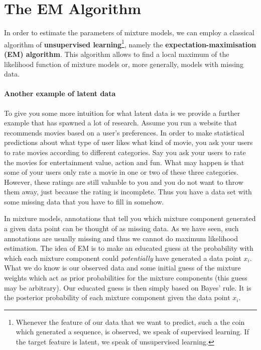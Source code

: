 \documentclass[a4paper,11pt,leqno]{report}\usepackage[]{graphicx}\usepackage[]{color}
\begin{document}
\section{The EM Algorithm}

In order to estimate the parameters of mixture models, we can employ a classical algorithm of 
\textbf{unsupervised learning}\footnote{Whenever the feature of our data that we want to predict, such a the coin which generated a sequence,
is observed, we speak of supervised learning. If the target feature is latent, we speak of unsupervised learning.}, 
namely the \textbf{expectation-maximisation (EM) algorithm}. This
algorithm allows to find a local maximum of the likelihood function of mixture models or, more
generally, models with missing data. 

\paragraph{Another example of latent data} To give you some more intuition for what latent data is we provide a further example that has
spawned a lot of research. Assume you run a website that recommends movies
based on a user's preferences. In order to make statistical predictions about what type of user
likes what kind of movie, you ask your users to rate movies according to different categories.
Say you ask your users to rate the movies for entertainment value, action and fun. What may happen is
that some of your users only rate a movie in one or two of these three categories. However, these
ratings are still valuable to you and you do not want to throw them away, just because the rating is
incomplete. Thus you have a data set with some missing data that you have to fill in somehow.
\bigskip

In mixture models, annotations that tell you which mixture component
generated a given data point can be thought of as missing data. As we have seen, such annotations
are usually missing and thus we cannot do maximum likelihood estimation. The idea of EM is to
make an educated guess at the probability with which each mixture component could \textit{potentially}
have generated a data point $ x_{i} $. What we do know is our observed data and some initial guess of the mixture
weights which act as prior probabilities for the mixture components (this guess may be arbitrary). 
Our educated guess is then simply based on Bayes' rule. It is the posterior probability of each mixture
component given the data point $ x_{i} $.
\end{document}
